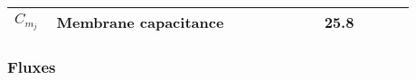 \begin{table}[h!]
\centering
\begin{tabular}{| p{0.09\linewidth} | >{\footnotesize} p{0.6\linewidth} | >{\footnotesize} p{0.17\linewidth} | >{\footnotesize} p{0.02\linewidth} |}
\arrayrulecolor{lightgrey}\hline
 $C_{m_{j}}$				& Membrane capacitance												& 25.8  \pF		& \cite{Koenigsberger2006} \\
 
\hline
\end{tabular}
\label{tab:JSRuptakei}
\end{table}

\subsubsection{Fluxes}
%
